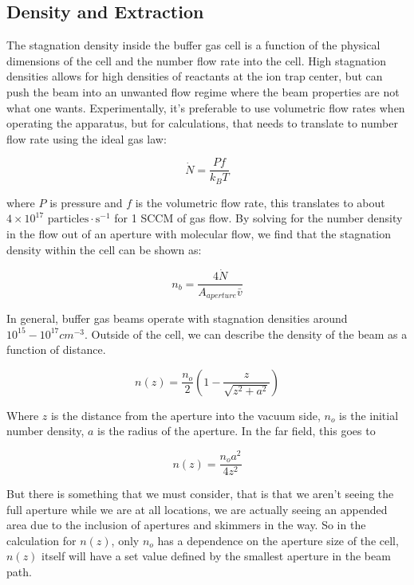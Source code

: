 \subsection{Density and Extraction}

The stagnation density inside the buffer gas cell is a function of the physical dimensions of the cell and the number flow rate into the cell. High stagnation densities allows for high densities of reactants at the ion trap center, but can push the beam into an unwanted flow regime where the beam properties are not what one wants. Experimentally, it's preferable to use volumetric flow rates when operating the apparatus, but for calculations, that needs to translate to number flow rate using the ideal gas law:

\begin{equation*}
	\dot{N} = \frac{P f}{k_B T}
\end{equation*}

where $P$ is pressure and $f$ is the volumetric flow rate, this translates to about $4\times10^{17} \text{ particles} \cdot \text{s}^{-1}$ for 1 SCCM of gas flow. By solving for the number density in the flow out of an aperture with molecular flow, we find that the stagnation density within the cell can be shown as:

\begin{equation*}
	n_{b}=\frac{4 \dot{N}}{A_{aperture} \bar{v}}
\end{equation*}

In general, buffer gas beams operate with stagnation densities around $10^{15}-10^{17} cm^{-3}$. Outside of the cell, we can describe the density of the beam as a function of distance. \cite{Pauly}

\begin{equation*}
	n(z)=\frac{n_o}{2}\left(1-\frac{z}{\sqrt{z^2+a^2}}\right)
\end{equation*}

Where $z$ is the distance from the aperture into the vacuum side, $n_o$ is the initial number density, $a$ is the radius of the aperture. In the far field, this goes to

\begin{equation*}
	n(z)=\frac{n_o a^2}{4 z^2}
\end{equation*}

But there is something that we must consider, that is that we aren't seeing the full aperture while we are at all locations, we are actually seeing an appended area due to the inclusion of apertures and skimmers in the way. So in the calculation for $n(z)$, only $n_o$ has a dependence on the aperture size of the cell, $n(z)$ itself will have a set value defined by the smallest aperture in the beam path.

